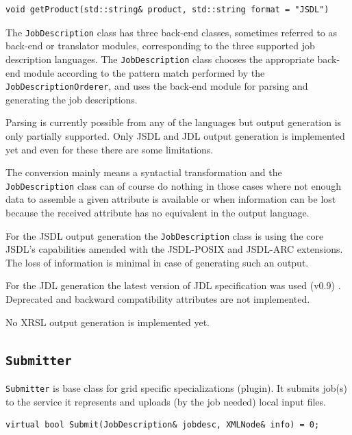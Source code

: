 \documentclass{book}
\newcommand{\JobDescription}{\texttt{JobDescription}}
\newcommand{\Submitter}{\texttt{Submitter}}
\begin{document}
\begin{shaded}
\begin{verbatim}
void getProduct(std::string& product, std::string format = "JSDL")
\end{verbatim}
\end{shaded}

The {\JobDescription} class has three back-end classes, sometimes
referred to as back-end or translator modules, corresponding to the
three supported job description languages. The {\JobDescription} class
chooses the appropriate back-end module according to the pattern match
performed by the \texttt{JobDescriptionOrderer}, and uses the back-end
module for parsing and generating the job descriptions.

Parsing is currently possible from any of the languages but output
generation is only partially supported. Only JSDL and JDL output
generation is implemented yet and even for these there are some
limitations.

The conversion mainly means a syntactial transformation and the
{\JobDescription} class can of course do nothing in those cases where
not enough data to assemble a given attribute is available or when
information can be lost because the received attribute has no
equivalent in the output language.

For the JSDL output generation the {\JobDescription} class is using
the core JSDL's capabilities amended with the JSDL-POSIX and JSDL-ARC
extensions. The loss of information is minimal in case of generating
such an output.

For the JDL generation the latest version of JDL specification was
used (v0.9) \cite{jdl}. Deprecated and backward compatibility
attributes are not implemented.

No XRSL output generation is implemented yet.

\subsection{{\Submitter}}

{\Submitter} is base class for grid specific specializations (plugin).
It submits job(s) to the service it represents and uploads (by the job
needed) local input files.

\begin{shaded}
\begin{verbatim}
virtual bool Submit(JobDescription& jobdesc, XMLNode& info) = 0;
\end{verbatim}
\end{shaded}
\end{document}
